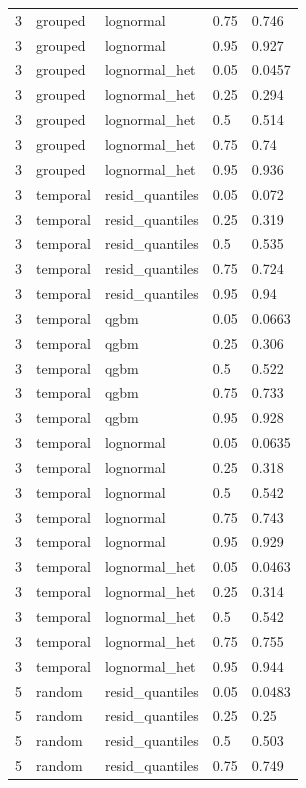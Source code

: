 \begin{tabular}{lllll}
3 & grouped & lognormal & 0.75 & 0.746 \\
3 & grouped & lognormal & 0.95 & 0.927 \\
3 & grouped & lognormal\_het & 0.05 & 0.0457 \\
3 & grouped & lognormal\_het & 0.25 & 0.294 \\
3 & grouped & lognormal\_het & 0.5 & 0.514 \\
3 & grouped & lognormal\_het & 0.75 & 0.74 \\
3 & grouped & lognormal\_het & 0.95 & 0.936 \\
3 & temporal & resid\_quantiles & 0.05 & 0.072 \\
3 & temporal & resid\_quantiles & 0.25 & 0.319 \\
3 & temporal & resid\_quantiles & 0.5 & 0.535 \\
3 & temporal & resid\_quantiles & 0.75 & 0.724 \\
3 & temporal & resid\_quantiles & 0.95 & 0.94 \\
3 & temporal & qgbm & 0.05 & 0.0663 \\
3 & temporal & qgbm & 0.25 & 0.306 \\
3 & temporal & qgbm & 0.5 & 0.522 \\
3 & temporal & qgbm & 0.75 & 0.733 \\
3 & temporal & qgbm & 0.95 & 0.928 \\
3 & temporal & lognormal & 0.05 & 0.0635 \\
3 & temporal & lognormal & 0.25 & 0.318 \\
3 & temporal & lognormal & 0.5 & 0.542 \\
3 & temporal & lognormal & 0.75 & 0.743 \\
3 & temporal & lognormal & 0.95 & 0.929 \\
3 & temporal & lognormal\_het & 0.05 & 0.0463 \\
3 & temporal & lognormal\_het & 0.25 & 0.314 \\
3 & temporal & lognormal\_het & 0.5 & 0.542 \\
3 & temporal & lognormal\_het & 0.75 & 0.755 \\
3 & temporal & lognormal\_het & 0.95 & 0.944 \\
5 & random & resid\_quantiles & 0.05 & 0.0483 \\
5 & random & resid\_quantiles & 0.25 & 0.25 \\
5 & random & resid\_quantiles & 0.5 & 0.503 \\
5 & random & resid\_quantiles & 0.75 & 0.749 \\

\end{tabular}
